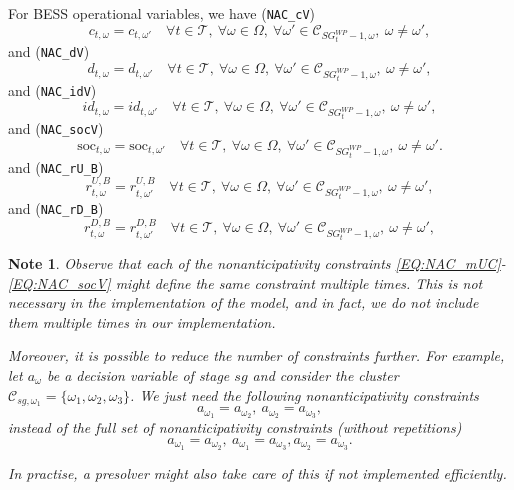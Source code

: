 \documentclass{article}
\newcommand{\soc}{\text{soc}}
\newtheorem{note}{Note}[section]
\begin{document}
For BESS operational variables, we have (\verb|NAC_cV|)
\begin{equation} \label{EQ:NAC_cV}
	c_{t, \omega} = c_{t, \omega'} \quad \forall t \in \mathcal{T}, \ \forall \omega \in \Omega, \ \forall \omega' \in \mathcal{C}_{SG^{WP}_t - 1, \omega}, \ \omega \neq \omega',
\end{equation}
and (\verb|NAC_dV|)
\begin{equation} \label{EQ:NAC_dV}
	d_{t, \omega} = d_{t, \omega'} \quad \forall t \in \mathcal{T}, \ \forall \omega \in \Omega, \ \forall \omega' \in \mathcal{C}_{SG^{WP}_t - 1, \omega}, \ \omega \neq \omega',
\end{equation}
and (\verb|NAC_idV|)
\begin{equation} \label{EQ:NAC_idV}
	id_{t, \omega} = id_{t, \omega'} \quad \forall t \in \mathcal{T}, \ \forall \omega \in \Omega, \ \forall \omega' \in \mathcal{C}_{SG^{WP}_t - 1, \omega}, \ \omega \neq \omega',
\end{equation}
and (\verb|NAC_socV|)
\begin{equation} \label{EQ:NAC_socV}
	\soc_{t, \omega} = \soc_{t, \omega'} \quad \forall t \in \mathcal{T}, \ \forall \omega \in \Omega, \ \forall \omega' \in \mathcal{C}_{SG^{WP}_t - 1, \omega}, \ \omega \neq \omega'.
\end{equation}
and (\verb|NAC_rU_B|)
\begin{equation} \label{EQ:NAC_rUB}
	r^{U,B}_{t, \omega} = r^{U,B}_{t, \omega'} \quad \forall t \in \mathcal{T},\ \forall \omega \in \Omega,\ \forall \omega' \in \mathcal{C}_{SG^{WP}_t - 1, \omega},\ \omega \neq \omega',
\end{equation}
and (\verb|NAC_rD_B|)
\begin{equation} \label{EQ:NAC_rDB}
	r^{D,B}_{t, \omega} = r^{D,B}_{t, \omega'} \quad \forall t \in \mathcal{T},\ \forall \omega \in \Omega,\ \forall \omega' \in \mathcal{C}_{SG^{WP}_t - 1, \omega},\ \omega \neq \omega',
\end{equation}
\begin{note}
Observe that each of the nonanticipativity constraints \eqref{EQ:NAC_mUC}-\eqref{EQ:NAC_socV} might define the same constraint multiple times. This is not necessary in the implementation of the model, and in fact, we do not include them multiple times in our implementation.
	
Moreover, it is possible to reduce the number of constraints further. For example, let $a_{\omega}$ be a decision variable of stage $sg$ and consider the cluster $\mathcal{C}_{sg, \omega_1} = \{ \omega_1, \omega_2, \omega_3 \}$. We just need the following nonanticipativity constraints 
$$
a_{\omega_1} = a_{\omega_2}, \ a_{\omega_2} = a_{\omega_3},
$$
instead of the full set of nonanticipativity constraints (without repetitions)
$$
a_{\omega_1} = a_{\omega_2}, \ a_{\omega_1} = a_{\omega_3}, a_{\omega_2} = a_{\omega_3}.
$$

In practise, a presolver might also take care of this if not implemented efficiently.	
\end{note}
\end{document}
